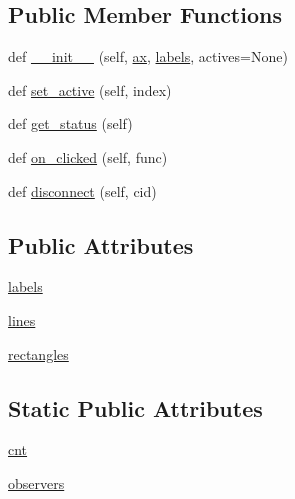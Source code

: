 \subsection*{Public Member Functions}
\begin{DoxyCompactItemize}
\item 
def \hyperlink{classmatplotlib_1_1widgets_1_1CheckButtons_a263cab4962771dad32ae9f7bff5ac9b4}{\+\_\+\+\_\+init\+\_\+\+\_\+} (self, \hyperlink{classmatplotlib_1_1widgets_1_1AxesWidget_ac0722858b7001d10a42055dc90420b4f}{ax}, \hyperlink{classmatplotlib_1_1widgets_1_1CheckButtons_a6cc26f36564fa6fcffd3637dd1d29317}{labels}, actives=None)
\item 
def \hyperlink{classmatplotlib_1_1widgets_1_1CheckButtons_a50ef24a39aa238582d6d492797ce42a6}{set\+\_\+active} (self, index)
\item 
def \hyperlink{classmatplotlib_1_1widgets_1_1CheckButtons_a19e5321e6e1910bcfbb11538a0d979b4}{get\+\_\+status} (self)
\item 
def \hyperlink{classmatplotlib_1_1widgets_1_1CheckButtons_a2521d9a8165bfbe0463537e8acc36b94}{on\+\_\+clicked} (self, func)
\item 
def \hyperlink{classmatplotlib_1_1widgets_1_1CheckButtons_a17c09771d95c7842999dfaa6f296127c}{disconnect} (self, cid)
\end{DoxyCompactItemize}
\subsection*{Public Attributes}
\begin{DoxyCompactItemize}
\item 
\hyperlink{classmatplotlib_1_1widgets_1_1CheckButtons_a6cc26f36564fa6fcffd3637dd1d29317}{labels}
\item 
\hyperlink{classmatplotlib_1_1widgets_1_1CheckButtons_a7b97d3a4d391ba49f71f3d462dd28394}{lines}
\item 
\hyperlink{classmatplotlib_1_1widgets_1_1CheckButtons_ac37fbe05a3f11927188a0594b8ac90b6}{rectangles}
\end{DoxyCompactItemize}
\subsection*{Static Public Attributes}
\begin{DoxyCompactItemize}
\item 
\hyperlink{classmatplotlib_1_1widgets_1_1CheckButtons_ad5be6ba7cd19eb0658d87d575ba73688}{cnt}
\item 
\hyperlink{classmatplotlib_1_1widgets_1_1CheckButtons_adcaf55ed36a6713517bb55e61f73a740}{observers}
\end{DoxyCompactItemize}
